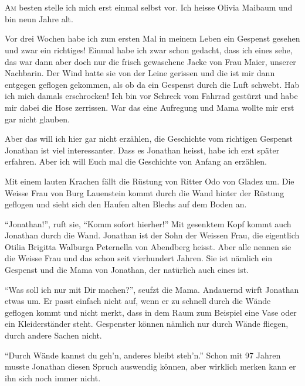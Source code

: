 \chapter*{}
\begin{mdframed}[style=mystyle]
\lettrine[lines=3]{\color{DeepPink}A}{m} besten stelle ich mich erst einmal selbst vor. Ich heisse Olivia Maibaum und bin neun Jahre alt. 

Vor drei Wochen habe ich zum ersten Mal in meinem Leben ein Gespenst gesehen und zwar ein richtiges! Einmal habe ich zwar schon gedacht, dass ich eines sehe, das war dann aber doch nur die frisch gewaschene Jacke von Frau Maier, unserer Nachbarin. Der Wind hatte sie von der Leine gerissen und die ist mir dann entgegen geflogen gekommen, als ob da ein Gespenst durch die Luft schwebt. Hab ich mich damals erschrocken! Ich bin vor Schreck vom Fahrrad gestürzt und habe mir dabei die Hose zerrissen.  War das eine Aufregung und Mama wollte mir erst gar nicht glauben.

Aber das will ich hier gar nicht erzählen, die Geschichte vom richtigen Gespenst Jonathan ist viel interessanter.  Dass es Jonathan heisst, habe ich erst später erfahren. Aber ich will Euch mal die Geschichte von Anfang an erzählen.
\end{mdframed}

Mit einem lauten Krachen fällt die Rüstung von Ritter Odo von Gladez um. Die Weisse Frau von Burg Lauenstein kommt durch die Wand hinter der Rüstung geflogen und sieht sich den Haufen alten Blechs auf dem Boden an.

\enquote{Jonathan!}, ruft sie, \enquote{Komm sofort hierher!} Mit gesenktem Kopf kommt auch Jonathan durch die Wand. Jonathan ist der Sohn der Weissen Frau, die eigentlich Otilia Brigitta Walburga Peternella von Abendberg heisst. Aber alle nennen sie die Weisse Frau und das schon seit vierhundert Jahren. Sie ist nämlich ein Gespenst und die Mama von Jonathan, der natürlich auch eines ist. 

\enquote{Was soll ich nur mit Dir machen?}, seufzt die Mama. Andauernd wirft Jonathan etwas um. Er passt einfach nicht auf, wenn er zu schnell durch die Wände geflogen kommt und nicht merkt, dass in dem Raum zum Beispiel eine Vase oder ein Kleiderständer steht. Gespenster können nämlich nur durch Wände fliegen, durch andere Sachen nicht. 

\enquote{Durch Wände kannst du geh'n, anderes bleibt steh'n.} Schon mit 97 Jahren musste Jonathan diesen Spruch auswendig können, aber wirklich merken kann er ihn sich noch immer nicht. 

